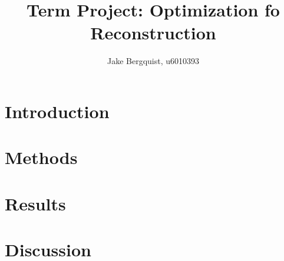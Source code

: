 \documentclass[12pt]{article}
\begin{document}
\title{Term Project: Optimization fo Reconstruction}
\author{Jake Bergquist, u6010393 }
\maketitle

\section{Introduction}


\section{Methods}

\section{Results}




\section{Discussion}




\end{document}
